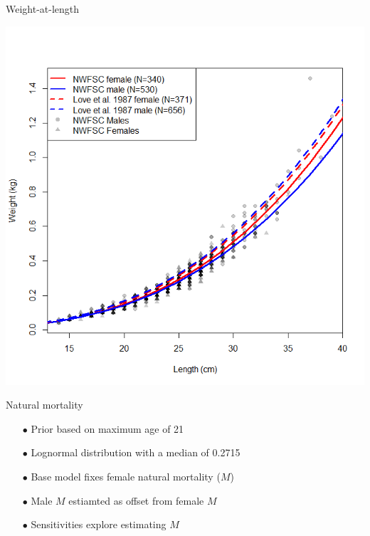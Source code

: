 \documentclass[ignorenonframetext,]{beamer}
\begin{document}
\begin{frame}{Weight-at-length}

\centering
 \includegraphics{Figures/Length_weight.png}

\end{frame}

\begin{frame}{Natural mortality}

\begin{itemize}
\item[$\bullet$] Prior based on maximum age of 21
\item[$\bullet$] Lognormal distribution with a median of 0.2715
\item[$\bullet$] Base model fixes female natural mortality ($M$)
\item[$\bullet$] Male $M$ estiamted as offset from female $M$
\item[$\bullet$] Sensitivities explore estimating $M$
\end{itemize}

\end{frame}
\end{document}
